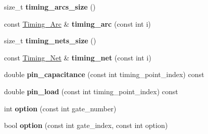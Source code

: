 \begin{DoxyCompactItemize}
\item 
\hypertarget{classTiming__Analysis_1_1Timing__Analysis_a239195867157ea06264afcdc3bb54e53}{size\-\_\-t {\bfseries timing\-\_\-arcs\-\_\-size} ()}\label{classTiming__Analysis_1_1Timing__Analysis_a239195867157ea06264afcdc3bb54e53}

\item 
\hypertarget{classTiming__Analysis_1_1Timing__Analysis_ab51fd160e68b13a059efdcc460da1e83}{const \hyperlink{classTiming__Analysis_1_1Timing__Arc}{Timing\-\_\-\-Arc} \& {\bfseries timing\-\_\-arc} (const int i)}\label{classTiming__Analysis_1_1Timing__Analysis_ab51fd160e68b13a059efdcc460da1e83}

\item 
\hypertarget{classTiming__Analysis_1_1Timing__Analysis_a0d0a28110de2017c754373f7a73c160d}{size\-\_\-t {\bfseries timing\-\_\-nets\-\_\-size} ()}\label{classTiming__Analysis_1_1Timing__Analysis_a0d0a28110de2017c754373f7a73c160d}

\item 
\hypertarget{classTiming__Analysis_1_1Timing__Analysis_ab113f7930936110307c215a90e410769}{const \hyperlink{classTiming__Analysis_1_1Timing__Net}{Timing\-\_\-\-Net} \& {\bfseries timing\-\_\-net} (const int i)}\label{classTiming__Analysis_1_1Timing__Analysis_ab113f7930936110307c215a90e410769}

\item 
\hypertarget{classTiming__Analysis_1_1Timing__Analysis_a0263a18b53ef152589a3396423490f78}{double {\bfseries pin\-\_\-capacitance} (const int timing\-\_\-point\-\_\-index) const }\label{classTiming__Analysis_1_1Timing__Analysis_a0263a18b53ef152589a3396423490f78}

\item 
\hypertarget{classTiming__Analysis_1_1Timing__Analysis_a6569529b1614d4507d48293c7ea9f544}{double {\bfseries pin\-\_\-load} (const int timing\-\_\-point\-\_\-index) const }\label{classTiming__Analysis_1_1Timing__Analysis_a6569529b1614d4507d48293c7ea9f544}

\item 
\hypertarget{classTiming__Analysis_1_1Timing__Analysis_a578a7940a493f7e6ab5ca4518984b8d4}{int {\bfseries option} (const int gate\-\_\-number)}\label{classTiming__Analysis_1_1Timing__Analysis_a578a7940a493f7e6ab5ca4518984b8d4}

\item 
\hypertarget{classTiming__Analysis_1_1Timing__Analysis_ad5d0274622ee3f7d2c2f3d731b35ac9a}{bool {\bfseries option} (const int gate\-\_\-index, const int option)}\label{classTiming__Analysis_1_1Timing__Analysis_ad5d0274622ee3f7d2c2f3d731b35ac9a}


\end{DoxyCompactItemize}
